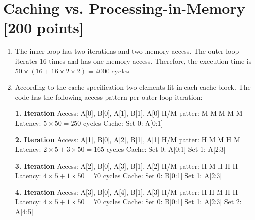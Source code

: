 \documentclass[a4paper]{article}
\begin{document}
\section{Caching vs. Processing-in-Memory [200 points]}

\begin{enumerate}[label=\alph*)]
    \item The inner loop has two iterations and two memory access. The outer loop iterates 16 times
        and has one memory access. Therefore, the execution time is 
        $50 \times (16 + 16 \times 2 \times 2) = 4000$ cycles.
    
    \item According to the cache specification two elements fit in each cache block. The code has 
        the following access pattern per outer loop iteration:

        \textbf{1. Iteration} \newline
        Access: A[0], B[0], A[1], B[1], A[0] \newline
        H/M patter: M M M M M \newline
        Latency: $5 \times 50 = 250$ cycles \newline
        Cache: Set 0: A[0:1] \newline
        
        \textbf{2. Iteration} \newline
        Access: A[1], B[0], A[2], B[1], A[1] \newline
        H/M patter: H M M H M \newline
        Latency: $2 \times 5 + 3 \times 50 = 165$ cycles \newline
        Cache: Set 0: A[0:1] Set 1: A[2:3] \newline

        \textbf{3. Iteration} \newline
        Access: A[2], B[0], A[3], B[1], A[2] \newline
        H/M patter: H M H H H \newline
        Latency: $4 \times 5 + 1 \times 50 = 70$ cycles \newline
        Cache: Set 0: B[0:1] Set 1: A[2:3] \newline
        
        \textbf{4. Iteration} \newline
        Access: A[3], B[0], A[4], B[1], A[3] \newline
        H/M patter: H H M H H \newline
        Latency: $4 \times 5 + 1 \times 50 = 70$ cycles \newline
        Cache: Set 0: B[0:1] Set 1: A[2:3] Set 2: A[4:5] \newline
        

\end{enumerate}
\end{document}
